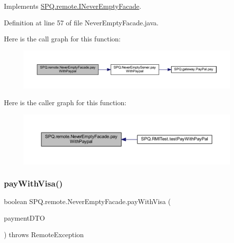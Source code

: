 Implements \mbox{\hyperlink{interface_s_p_q_1_1remote_1_1_i_never_empty_facade_a2d34c64f91537d8c7138094e418de785}{S\+P\+Q.\+remote.\+I\+Never\+Empty\+Facade}}.



Definition at line 57 of file Never\+Empty\+Facade.\+java.

Here is the call graph for this function\+:
\nopagebreak
\begin{figure}[H]
\begin{center}
\leavevmode
\includegraphics[width=350pt]{class_s_p_q_1_1remote_1_1_never_empty_facade_a9942c7930b5144f0677dc0fdcde25cc3_cgraph}
\end{center}
\end{figure}
Here is the caller graph for this function\+:
\nopagebreak
\begin{figure}[H]
\begin{center}
\leavevmode
\includegraphics[width=350pt]{class_s_p_q_1_1remote_1_1_never_empty_facade_a9942c7930b5144f0677dc0fdcde25cc3_icgraph}
\end{center}
\end{figure}
\mbox{\label{class_s_p_q_1_1remote_1_1_never_empty_facade_a0ff9201cf33cb76c43dd85c892af93ba}} 
\subsubsection{\texorpdfstring{pay\+With\+Visa()}{payWithVisa()}}
{\footnotesize\ttfamily boolean S\+P\+Q.\+remote.\+Never\+Empty\+Facade.\+pay\+With\+Visa (\begin{DoxyParamCaption}\item[{\mbox{\hyperlink{class_s_p_q_1_1dto_1_1_payment_d_t_o}{Payment\+D\+TO}}}]{payment\+D\+TO }\end{DoxyParamCaption}) throws Remote\+Exception}




